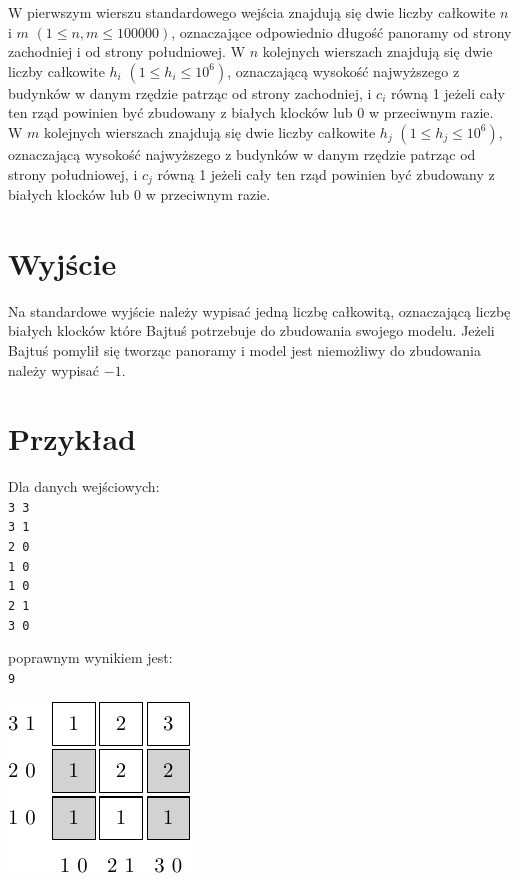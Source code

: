 \documentclass[10pt]{article}
\begin{document}
    W pierwszym wierszu standardowego wejścia znajdują się dwie liczby całkowite $n$ i $m$ $(1 \leq n, m \leq 100000)$, oznaczające odpowiednio długość panoramy od strony zachodniej i od strony południowej. W $n$ kolejnych wierszach znajdują się dwie liczby całkowite $h_{i}$ $(1\leq h_{i}\leq 10^{6})$, oznaczającą wysokość najwyższego z budynków w danym rzędzie patrząc od strony zachodniej, i $c_{i}$ równą 1 jeżeli cały ten rząd powinien być zbudowany z białych klocków lub 0 w przeciwnym razie. W $m$ kolejnych wierszach znajdują się dwie liczby całkowite $h_{j}$ $(1\leq h_{j}\leq 10^{6})$, oznaczającą wysokość najwyższego z budynków w danym rzędzie patrząc od strony południowej, i $c_{j}$ równą 1 jeżeli cały ten rząd powinien być zbudowany z białych klocków lub 0 w przeciwnym razie.


    \section*{Wyjście}
    
    Na standardowe wyjście należy wypisać jedną liczbę całkowitą, oznaczającą liczbę białych klocków które Bajtuś potrzebuje do zbudowania swojego modelu. Jeżeli Bajtuś pomylił się tworząc panoramy i model jest niemożliwy do zbudowania należy wypisać $-1$.


    \section*{Przykład}
    
    \noindent
    \begin{minipage}[t]{0.5\textwidth}
        Dla danych wejściowych:\vspace{1ex}\\
        \texttt{3 3\\3 1\\2 0\\1 0\\1 0\\2 1\\3 0}
    \end{minipage}
    \begin{minipage}[t]{0.5\textwidth}
        poprawnym wynikiem jest:\vspace{1ex}\\
        \texttt{9}
    \end{minipage}
    
    \vspace{-5em}
    \begin{center}
        \includegraphics{wierys-1.pdf}
    \end{center}
    
\end{document}
